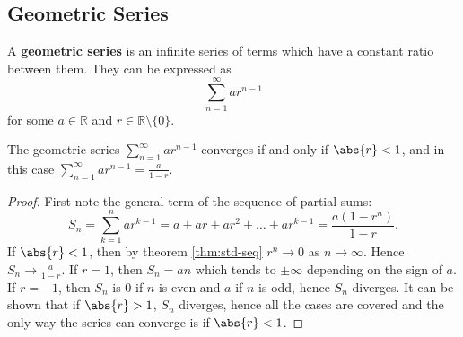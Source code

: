 \documentclass[../real_analysis.tex]{subfiles}
\begin{document}
        \subsection{Geometric Series}\label{subsec:geometric-series}
            \begin{definition}
                A \textbf{geometric series} is an infinite series of terms which have a constant ratio between them. They can be expressed as
                \begin{equation}
                    \sum_{n=1}^\infty ar^{n-1}
                \end{equation}
                for some $a\in\mathbb{R}$ and $r\in\mathbb{R}\setminus\{0\}$.
            \end{definition}
            \begin{theorem}\label{thm:geometric-series}
                The geometric series $\sum_{n=1}^\infty ar^{n-1}$ converges if and only if $\abs{r}<1$, and in this case $\sum_{n=1}^\infty ar^{n-1}=\frac{a}{1-r}$.
            \end{theorem}
            \begin{proof}
                First note the general term of the sequence of partial sums:
                \begin{equation}
                    S_n=\sum_{k=1}^n ar^{k-1}=a+ar+ar^2+\dots+ar^{k-1}=\frac{a(1-r^n)}{1-r}\tag{$r\neq1$}. %
                \end{equation}
                If $\abs{r}<1$, then by theorem \ref{thm:std-seq} $r^n\to0$ as $n\to\infty$. Hence $S_n\to\frac{a}{1-r}$. If $r=1$, then $S_n=an$ which tends to $\pm\infty$ depending on the sign of $a$. If $r=-1$, then $S_n$ is 0 if $n$ is even and $a$ if $n$ is odd, hence $S_n$ diverges. It can be shown that if $\abs{r}>1$, $S_n$ diverges, hence all the cases are covered and the only way the series can converge is if $\abs{r}<1$.
            \end{proof}
\end{document}
